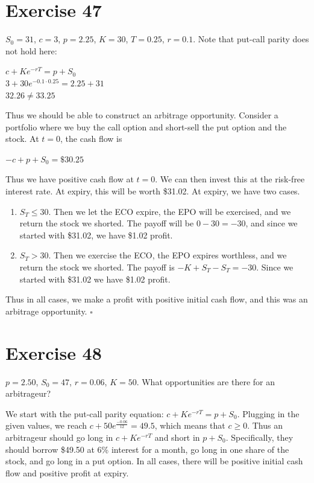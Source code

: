 \documentclass{article}
\begin{document}
\section*{Exercise 47}
\begin{flushleft}
    $S_0 = 31$, $c = 3$, $p = 2.25$, $K = 30$, $T = 0.25$, $r=0.1$.
    Note that put-call parity does not hold here:
    \begin{center}
        $c + Ke^{-rT} = p + S_0$ \\
        $3 + 30e^{-0.1 \cdot 0.25} = 2.25 + 31$ \\
        $32.26 \neq 33.25$
    \end{center}
    Thus we should be able to construct an arbitrage opportunity. Consider a portfolio where
    we buy the call option and short-sell the put option and the stock. At $t=0$, the cash flow is
    \begin{center}
        $-c + p + S_0 = \$30.25$
    \end{center}
    Thus we have positive cash flow at $t=0$. We can then invest this at the risk-free interest rate. At expiry, this will be worth \$31.02. At expiry, we have two cases.
    \begin{enumerate}
        \item $S_T \leq 30$. Then we let the ECO expire, the EPO will be exercised, and we return the stock we shorted. The payoff will be $0 - 30 = -30$,
                and since we started with \$31.02, we have \$1.02 profit.
        \item $S_T > 30$. Then we exercise the ECO, the EPO expires worthless, and we return the stock we shorted. The payoff is $-K + S_T - S_T = -30$.
                Since we started with \$31.02 we have \$1.02 profit.
    \end{enumerate}
    Thus in all cases, we make a profit with positive initial cash flow, and this was an arbitrage opportunity. $\square$
\end{flushleft}

\section*{Exercise 48}
$p = 2.50$, $S_0 = 47$, $r = 0.06$, $K=50$. What opportunities are there for an arbitrageur?
\begin{flushleft}
    We start with the put-call parity equation: $c + Ke^{-rT} = p + S_0$. Plugging in the given values, we reach $c + 50e^{\frac{-0.06}{12}} = 49.5$, which means that $c \geq 0$.
    Thus an arbitrageur should go long in $c + Ke^{-rT}$ and short in $p + S_0$. Specifically, they should borrow \$49.50 at 6\% interest for a month, go long in one share of the stock, and go long in a put option. In all cases, there will be positive initial cash flow and positive profit at expiry.
\end{flushleft}
\end{document}
